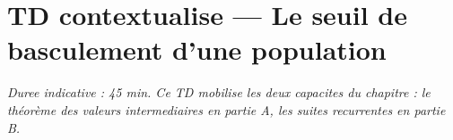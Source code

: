 
\section*{TD contextualise — Le seuil de basculement d'une population}

\emph{Duree indicative : 45 min. Ce TD mobilise les deux capacites du chapitre :
le théorème des valeurs intermediaires en partie A, les suites recurrentes en
partie B.}

